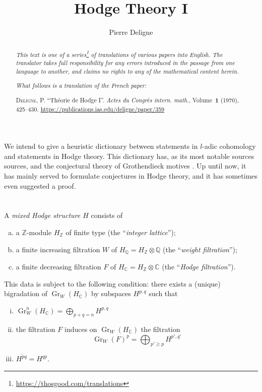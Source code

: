 \documentclass{article}
\title{Hodge Theory I}
\author{Pierre Deligne}
\date{}
\newcommand{\doctype}{French paper}
\newcommand{\origcit}{%
  \textsc{Deligne, P.}
  ``Th\'{e}orie de Hodge I''.
  \emph{Actes du Congr\`{e}s intern. math.}, Volume~\textbf{1} (1970), 425--430.
  \url{https://publications.ias.edu/deligne/paper/359}%
}
\theoremstyle{plain}
\theoremstyle{definition}
\newenvironment{definition}[1]
    {\renewcommand\theinnerdefinition{#1}\innerdefinition}
    {\endinnerdefinition}
\newcommand{\ZZ}{\mathbb{Z}}
\newcommand{\QQ}{\mathbb{Q}}
\newcommand{\CC}{\mathbb{C}}
\DeclareMathOperator{\Gr}{Gr}
\renewcommand{\geq}{\geqslant}
\newcommand{\oldpage}[1]{\marginpar{\footnotesize$\Big\vert$ \textit{p.~#1}}}
\begin{document}
\maketitle
\thispagestyle{fancy}

\renewcommand{\abstractname}{Translator's note.}

\begin{abstract}
  \renewcommand*{\thefootnote}{\fnsymbol{footnote}}
  \emph{This text is one of a series\footnote{\url{https://thosgood.com/translations}} of translations of various papers into English.}
  \emph{The translator takes full responsibility for any errors introduced in the passage from one language to another, and claims no rights to any of the mathematical content herein.}
  
  \emph{What follows is a translation of the \doctype:}

  \medskip\noindent
  \origcit
\end{abstract}

\setcounter{footnote}{0}

\bigskip



\oldpage{425}
We intend to give a heuristic dictionary between statements in $l$-adic cohomology and statements in Hodge theory.
This dictionary has, as its most notable sources sources, \cite{3} and the conjectural theory of Grothendieck motives \cite{2}.
Up until now, it has mainly served to formulate conjectures in Hodge theory, and it has sometimes even suggested a proof.


\section{}
\label{1}

\begin{definition}{1.1}
  A \emph{mixed Hodge structure $H$} consists of
  \begin{enumerate}[(a)]
    \item a $\ZZ$-module $H_\ZZ$ of finite type (the ``\emph{integer lattice}'');
    \item a finite increasing filtration $W$ of $H_\QQ = H_\ZZ\otimes\QQ$ (the ``\emph{weight filtration}'');
    \item a finite decreasing filtration $F$ of $H_\CC = H_\ZZ\otimes\CC$ (the ``\emph{Hodge filtration}'').
  \end{enumerate}
  This data is subject to the following condition:
  there exists a (unique) bigradation of $\Gr_W(H_\CC)$ by subspaces $H^{p,q}$ such that
  \begin{enumerate}[(i)]
    \item $\Gr_W^n(H_\CC) = \bigoplus_{p+q=n}H^{p,q}$
    \item the filtration $F$ induces on $\Gr_W(H_\CC)$ the filtration
      \[
        \Gr_W(F)^p = \bigoplus_{p'\geq p} H^{p',q'}
      \]
    \item $\overline{H^{pq}}=H^{qp}$.
  \end{enumerate}
\end{definition}
\end{document}
